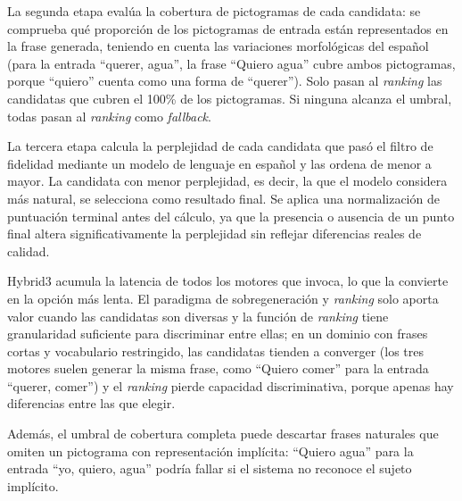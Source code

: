 La segunda etapa evalúa la cobertura de pictogramas de cada candidata: se comprueba qué proporción de los pictogramas de entrada están representados en la frase generada, teniendo en cuenta las variaciones morfológicas del español (para la entrada ``querer, agua'', la frase ``Quiero agua'' cubre ambos pictogramas, porque ``quiero'' cuenta como una forma de ``querer''). Solo pasan al \textit{ranking} las candidatas que cubren el 100\% de los pictogramas. Si ninguna alcanza el umbral, todas pasan al \textit{ranking} como \textit{fallback}.

La tercera etapa calcula la perplejidad de cada candidata que pasó el filtro de fidelidad mediante un modelo de lenguaje en español y las ordena de menor a mayor. La candidata con menor perplejidad, es decir, la que el modelo considera más natural, se selecciona como resultado final. Se aplica una normalización de puntuación terminal antes del cálculo, ya que la presencia o ausencia de un punto final altera significativamente la perplejidad sin reflejar diferencias reales de calidad.

Hybrid3 acumula la latencia de todos los motores que invoca, lo que la convierte en la opción más lenta. El paradigma de sobregeneración y \textit{ranking} solo aporta valor cuando las candidatas son diversas y la función de \textit{ranking} tiene granularidad suficiente para discriminar entre ellas; en un dominio con frases cortas y vocabulario restringido, las candidatas tienden a converger (los tres motores suelen generar la misma frase, como ``Quiero comer'' para la entrada ``querer, comer'') y el \textit{ranking} pierde capacidad discriminativa, porque apenas hay diferencias entre las que elegir.

Además, el umbral de cobertura completa puede descartar frases naturales que omiten un pictograma con representación implícita: ``Quiero agua'' para la entrada ``yo, quiero, agua'' podría fallar si el sistema no reconoce el sujeto implícito.
